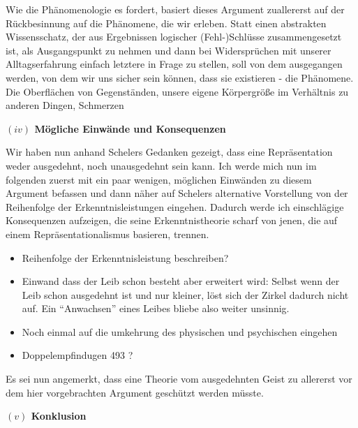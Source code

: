 \documentclass[a4paper, 12pt]{article}
\begin{document}
\begin{onehalfspace}
Wie die Phänomenologie es fordert, basiert dieses Argument zuallererst auf der Rückbesinnung auf die Phänomene, die wir erleben. Statt einen abstrakten Wissensschatz, der aus Ergebnissen logischer (Fehl-)Schlüsse zusammengesetzt ist, als Ausgangspunkt zu nehmen und dann bei Widersprüchen mit unserer Alltagserfahrung einfach letztere in Frage zu stellen, soll von dem ausgegangen werden, von dem wir uns sicher sein können, dass sie existieren - die Phänomene. Die Oberflächen von Gegenständen, unsere eigene Körpergröße im Verhältnis zu anderen Dingen, Schmerzen

\vspace{5mm}
\noindent\textbf{$(iv)$ Mögliche Einwände und Konsequenzen} %


\noindent Wir haben nun anhand Schelers Gedanken gezeigt, dass eine Repräsentation weder ausgedehnt, noch unausgedehnt sein kann. Ich werde mich nun im folgenden zuerst mit ein paar wenigen, möglichen Einwänden zu diesem Argument befassen und dann näher auf Schelers alternative Vorstellung von der Reihenfolge der Erkenntnisleistungen eingehen. Dadurch werde ich einschlägige Konsequenzen aufzeigen, die seine Erkenntnistheorie scharf von jenen, die auf einem Repräsentationalismus basieren, trennen.


\begin{itemize}
  \item Reihenfolge der Erkenntnisleistung beschreiben?
  \item Einwand dass der Leib schon besteht aber erweitert wird: Selbst wenn der Leib schon ausgedehnt ist und nur kleiner, löst sich der Zirkel dadurch nicht auf. Ein "`Anwachsen"' eines Leibes bliebe also weiter unsinnig.
  \item Noch einmal auf die umkehrung des physischen und psychischen eingehen 
  \item Doppelempfindugen 493 ?
\end{itemize}

Es sei nun angemerkt, dass eine Theorie vom ausgedehnten Geist zu allererst vor dem hier vorgebrachten Argument geschützt werden müsste. 





\vspace{5mm}
\noindent\textbf{$(v)$ Konklusion}


\end{onehalfspace}
\end{document}
